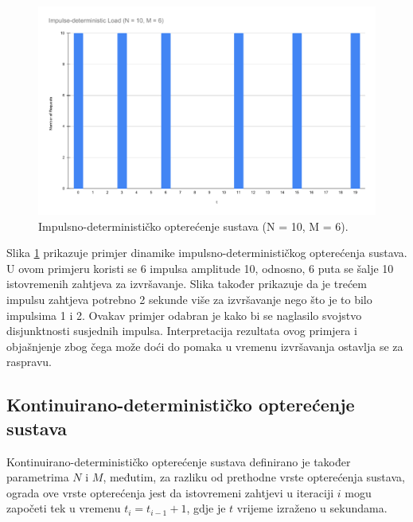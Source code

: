 \documentclass[times, utf8, diplomski]{fer}
\begin{document}
\begin{figure}[htb]
	\centering
	\includegraphics[width=\textwidth]{images/Impulse-deterministic Load (N = 10, M = 6).pdf}
	\caption{
		Impulsno-determinističko opterećenje sustava (N = 10, M = 6).
	}
	\label{fig:impulse-load}
\end{figure}

Slika \ref{fig:impulse-load} prikazuje primjer dinamike impulsno-determinističkog opterećenja sustava. U ovom primjeru koristi se 6 impulsa amplitude 10, odnosno, 6 puta se šalje 10 istovremenih zahtjeva za izvršavanje. Slika također prikazuje da je trećem impulsu zahtjeva potrebno 2 sekunde više za izvršavanje nego što je to bilo impulsima 1 i 2. Ovakav primjer odabran je kako bi se naglasilo svojstvo disjunktnosti susjednih impulsa. Interpretacija rezultata ovog primjera i objašnjenje zbog čega može doći do pomaka u vremenu izvršavanja ostavlja se za raspravu.

\subsection{Kontinuirano-determinističko opterećenje sustava}
Kontinuirano-determinističko opterećenje sustava definirano je također parametrima $N$ i $M$, međutim, za razliku od prethodne vrste opterećenja sustava, ograda ove vrste opterećenja jest da istovremeni zahtjevi u iteraciji $i$ mogu započeti tek u vremenu $t_i = t_{i - 1} + 1$, gdje je $t$ vrijeme izraženo u sekundama.
\end{document}
